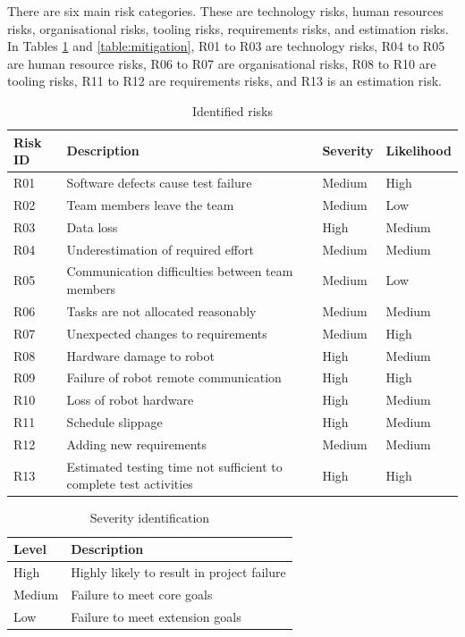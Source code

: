 \documentclass[12pt]{article}
\begin{document}
There are six main risk categories. These are technology risks, human resources risks, organisational risks, tooling risks, requirements risks, and estimation risks. In Tables \ref{table:risk} and \ref{table:mitigation}, R01 to R03 are technology risks, R04 to R05 are human resource risks, R06 to R07 are organisational risks, R08 to R10 are tooling risks, R11 to R12 are requirements risks, and R13 is an estimation risk.

\begin{table}
\begin{tabular}{ | p{} | p{}| p{} |p{}|}
\hline
\textbf{Risk ID} &  \textbf{Description} &  \textbf {Severity} & \textbf{Likelihood} \\
\hline
R01 & Software defects cause test failure & Medium & High\\
\hline
R02 & Team members leave the team &  Medium & Low\\
\hline
R03 & Data loss & High & Medium\\
\hline
R04 & Underestimation of required effort & Medium & Medium\\
\hline
R05 & Communication difficulties between team members & Medium & Low\\
\hline
R06 & Tasks are not allocated reasonably & Medium & Medium \\
\hline
R07 & Unexpected changes to requirements & Medium & High\\
\hline
R08 & Hardware damage to robot & High & Medium\\
\hline
R09 & Failure of robot remote communication & High & High\\
\hline
R10& Loss of robot hardware &High &Medium\\
\hline
R11 & Schedule slippage & High & Medium\\
\hline
R12 & Adding new requirements & Medium &Medium\\
\hline
R13 & Estimated testing time not sufficient to complete test activities &High &High\\
\hline 

\end{tabular}
\caption{Identified risks}
\label{table:risk}
\end{table} 

\begin{table}
\centering
\begin{tabular}{ | p{} | p{}|}
\hline
\textbf{Level} & \textbf{Description} \\
\hline
High & Highly likely to result in project failure\\
\hline
Medium & Failure to meet core goals\\ 
\hline
Low & Failure to meet extension goals\\
\hline
\end{tabular}
\caption{Severity identification}
\label{table:Severity}
\end{table}
\end{document}
